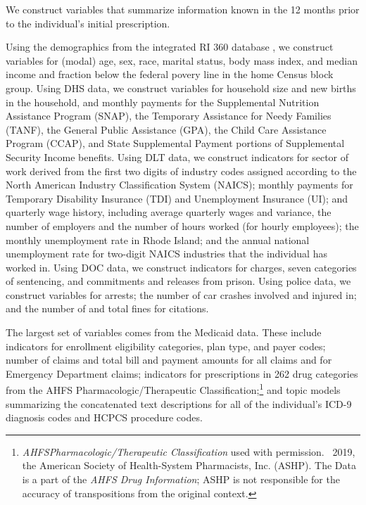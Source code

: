 \documentclass[9pt,twoside,lineno]{pnas-new}
\begin{document}
We construct variables that summarize information known in the 12 months prior to the individual's initial prescription.

Using the demographics from the integrated RI 360 database \cite{hastings}, we construct variables for (modal) age, sex, race, marital status, body mass index, and median income and fraction below the federal povery line in the home Census block group. Using DHS data, we construct variables for household size and new births in the household, and monthly payments for the Supplemental Nutrition Assistance Program (SNAP), the Temporary Assistance for Needy Families (TANF), the General Public Assistance (GPA), the Child Care Assistance Program (CCAP), and State Supplemental Payment portions of Supplemental Security Income benefits. Using DLT data, we construct indicators for sector of work derived from the first two digits of industry codes assigned according to the North American Industry Classification System (NAICS); monthly payments for Temporary Disability Insurance (TDI) and Unemployment Insurance (UI); and quarterly wage history, including average quarterly wages and variance, the number of employers and the number of hours worked (for hourly employees); the monthly unemployment rate in Rhode Island; and the annual national unemployment rate for two-digit NAICS industries that the individual has worked in. Using DOC data, we construct indicators for charges, seven categories of sentencing, and commitments and releases from prison. Using police data, we construct variables for arrests; the number of car crashes involved and injured in; and the number of and total fines for citations.

The largest set of variables comes from the Medicaid data. These include indicators for enrollment eligibility categories, plan type, and payer codes; number of claims and total bill and payment amounts for all claims and for Emergency Department claims; indicators for prescriptions in 262 drug categories from the AHFS Pharmacologic/Therapeutic Classification;\footnote{{\em AHFS\textsuperscript \textregistered Pharmacologic/Therapeutic Classification\textsuperscript \textcopyright} used with permission. \textcopyright\ 2019, the American Society of Health-System Pharmacists, Inc. (ASHP). The Data is a part of the {\em AHFS Drug Information\textsuperscript \textregistered}; ASHP is not responsible for the accuracy of transpositions from the original context.} and topic models summarizing the concatenated text descriptions for all of the individual's ICD-9 diagnosis codes and HCPCS procedure codes.
\end{document}
